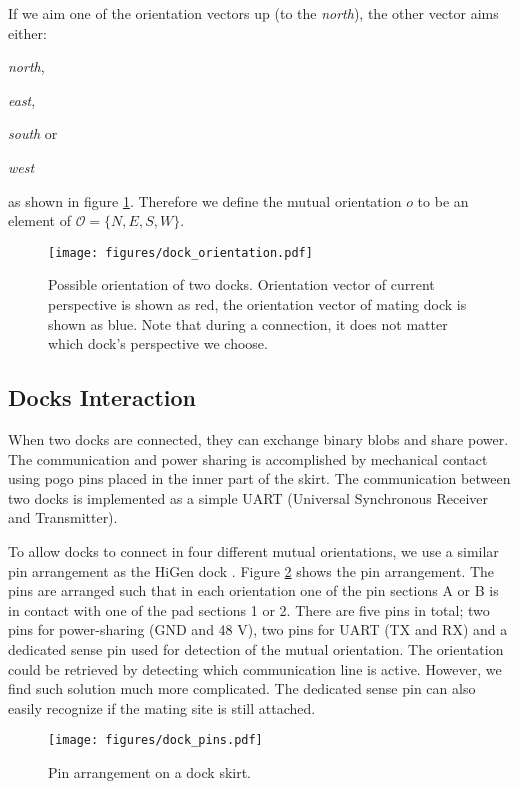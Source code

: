 If we aim one of the orientation vectors up (to the \emph{north}), the other
vector aims either:
\begin{enumerate*}
    \item \emph{north},
    \item \emph{east},
    \item \emph{south} or
    \item \emph{west}
\end{enumerate*}
as shown in figure \ref{fig:dock_orientation}. Therefore we define the mutual
orientation $o$ to be an element of $\mathcal{O} = \{N, E, S, W\}$.

\begin{figure}[!ht]
    \centering
    \texttt{[image: figures/dock\_orientation.pdf]}
    \caption{Possible orientation of two docks. Orientation vector of current
    perspective is shown as red, the orientation vector of mating dock is shown
    as blue. Note that during a connection, it does not matter which dock's
    perspective we choose.}
    \label{fig:dock_orientation}
\end{figure}


\subsection{Docks Interaction}\label{sec:dock_interaction}

When two docks are connected, they can exchange binary blobs and share power.
The communication and power sharing is accomplished by mechanical contact using
pogo pins placed in the inner part of the skirt. The communication between two
docks is implemented as a simple UART (Universal Synchronous Receiver and
Transmitter).

To allow docks to connect in four different mutual orientations, we use a
similar pin arrangement as the HiGen dock \cite{parrott_higen:_2014}. Figure
\ref{fig:dock_pins} shows the pin arrangement. The pins are arranged such that
in each orientation one of the pin sections A or B is in contact with one of the
pad sections 1 or 2. There are five pins in total; two pins for power-sharing
(GND and 48 V), two pins for UART (TX and RX) and a dedicated sense pin used for
detection of the mutual orientation. The orientation could be retrieved by
detecting which communication line is active. However, we find such solution
much more complicated. The dedicated sense pin can also easily recognize if the
mating site is still attached.

\begin{figure}[t]
    \centering
    \texttt{[image: figures/dock\_pins.pdf]}
    \caption{Pin arrangement on a dock skirt. }
    \label{fig:dock_pins}
\end{figure}

